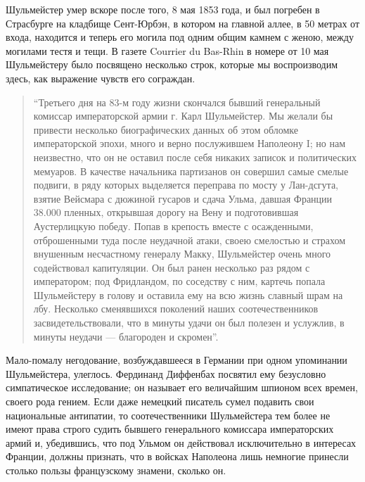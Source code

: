\documentclass[
  oneside,
  12pt,
  titlepage]{book}
\begin{document}
Шульмейстер умер вскоре после того, 8 мая 1853 года, и был погребен в Страсбурге на кладбище Сент-Юрбэн, в котором на главной аллее, в 50 метрах от входа, находится и теперь его могила под одним общим камнем с женою, между могилами тестя и тещи. В газете Courrier du Bas-Rhin в номере от 10 мая Шульмейстеру было посвящено несколько строк, которые мы воспроизводим здесь, как выражение чувств его сограждан.

\begin{quote}
``Третьего дня на 83-м году жизни скончался бывший генеральный комиссар императорской армии г. Карл Шульмейстер. Мы желали бы привести несколько биографических данных об этом обломке императорской эпохи, много и верно послужившем Наполеону I; но нам неизвестно, что он не оставил после себя никаких записок и политических мемуаров. В качестве начальника партизанов он совершил самые смелые подвиги, в ряду которых выделяется переправа по мосту у Лан-дсгута, взятие Вейсмара с дюжиной гусаров и сдача Ульма, давшая Франции 38.000 пленных, открывшая дорогу на Вену и подготовившая Аустерлицкую победу. Попав в крепость вместе с осажденными, отброшенными туда после неудачной атаки, своею смелостью и страхом внушенным несчастному генералу Макку, Шульмейстер очень много содействовал капитуляции. Он был ранен несколько раз рядом с императором; под Фридландом, по соседству с ним, картечь попала Шульмейстеру в голову и оставила ему на всю жизнь славный шрам на лбу. Несколько сменявшихся поколений наших соотечественников засвидетельствовали, что в минуты удачи он был полезен и услужлив, в минуты неудачи --- благороден и скромен''.
\end{quote}

Мало-помалу негодование, возбуждавшееся в Германии при одном упоминании Шульмейстера, улеглось. Фердинанд Диффенбах посвятил ему безусловно симпатическое исследование; он называет его величайшим шпионом всех времен, своего рода гением. Если даже немецкий писатель сумел подавить свои национальные антипатии, то соотечественники Шульмейстера тем более не имеют права строго судить бывшего генерального комиссара императорских армий и, убедившись, что под Ульмом он действовал исключительно в интересах Франции, должны признать, что в войсках Наполеона лишь немногие принесли столько пользы французскому знамени, сколько он.
\end{document}
